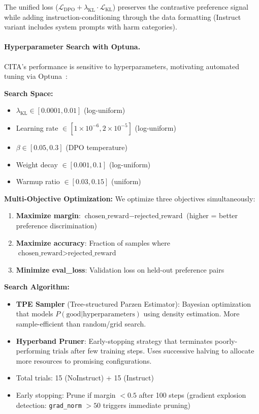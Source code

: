 The unified loss ($\mathcal{L}_{\text{DPO}} + \lambda_{\text{KL}} \cdot \mathcal{L}_{\text{KL}}$) preserves the contrastive preference signal while adding instruction-conditioning through the data formatting (Instruct variant includes system prompts with harm categories).

\paragraph{Hyperparameter Search with Optuna.} CITA's performance is sensitive to hyperparameters, motivating automated tuning via Optuna~\cite{akiba2019optuna}:

\textbf{Search Space:}
\begin{itemize}[leftmargin=*]
    \item $\lambda_{\text{KL}} \in [0.0001, 0.01]$ (log-uniform)
    \item Learning rate $\in [1 \times 10^{-6}, 2 \times 10^{-5}]$ (log-uniform)
    \item $\beta \in [0.05, 0.3]$ (DPO temperature)
    \item Weight decay $\in [0.001, 0.1]$ (log-uniform)
    \item Warmup ratio $\in [0.03, 0.15]$ (uniform)
\end{itemize}

\textbf{Multi-Objective Optimization:} We optimize three objectives simultaneously:
\begin{enumerate}[leftmargin=*]
    \item \textbf{Maximize margin}: $\text{chosen\_reward} - \text{rejected\_reward}$ (higher = better preference discrimination)
    \item \textbf{Maximize accuracy}: Fraction of samples where $\text{chosen\_reward} > \text{rejected\_reward}$
    \item \textbf{Minimize eval\_loss}: Validation loss on held-out preference pairs
\end{enumerate}

\textbf{Search Algorithm:}
\begin{itemize}[leftmargin=*]
    \item \textbf{TPE Sampler} (Tree-structured Parzen Estimator): Bayesian optimization that models $P(\text{good} | \text{hyperparameters})$ using density estimation. More sample-efficient than random/grid search.
    \item \textbf{Hyperband Pruner}: Early-stopping strategy that terminates poorly-performing trials after few training steps. Uses successive halving to allocate more resources to promising configurations.
    \item Total trials: 15 (NoInstruct) + 15 (Instruct)
    \item Early stopping: Prune if margin $< 0.5$ after 100 steps (gradient explosion detection: \texttt{grad\_norm} $> 50$ triggers immediate pruning)
\end{itemize}


